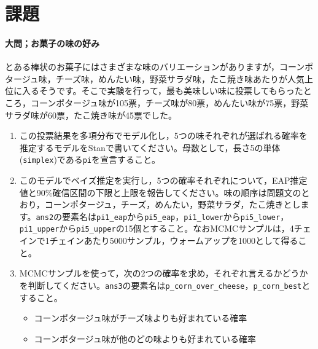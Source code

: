\documentclass{ltjsbook}
\begin{document}
\section{課題}


\paragraph{大問；お菓子の味の好み}
とある棒状のお菓子にはさまざまな味のバリエーションがありますが，コーンポタージュ味，チーズ味，めんたい味，野菜サラダ味，たこ焼き味あたりが人気上位に入るそうです。そこで実験を行って，最も美味しい味に投票してもらったところ，コーンポタージュ味が105票，チーズ味が80票，めんたい味が75票，野菜サラダ味が60票，たこ焼き味が45票でした。
\begin{enumerate}
	\item この投票結果を多項分布でモデル化し，5つの味それぞれが選ばれる確率を推定するモデルをStanで書いてください。母数として，長さ5の単体(\verb|simplex|)である\verb|pi|を宣言すること。
	\item このモデルでベイズ推定を実行し，5つの確率それぞれについて，EAP推定値と90\%確信区間の下限と上限を報告してください。味の順序は問題文のとおり，コーンポタージュ，チーズ，めんたい，野菜サラダ，たこ焼きとします。\verb|ans2|の要素名は\verb|pi1_eap|から\verb|pi5_eap|，\verb|pi1_lower|から\verb|pi5_lower|，\verb|pi1_upper|から\verb|pi5_upper|の15個とすること。なおMCMCサンプルは，4チェインで1チェインあたり5000サンプル，ウォームアップを1000として得ること。
	\item MCMCサンプルを使って，次の2つの確率を求め，それぞれ言えるかどうかを判断してください。\verb|ans3|の要素名は\verb|p_corn_over_cheese|，\verb|p_corn_best|とすること。
	      \begin{itemize}
		      \item コーンポタージュ味がチーズ味よりも好まれている確率
		      \item コーンポタージュ味が他のどの味よりも好まれている確率
	      \end{itemize}
\end{enumerate}
\end{document}
